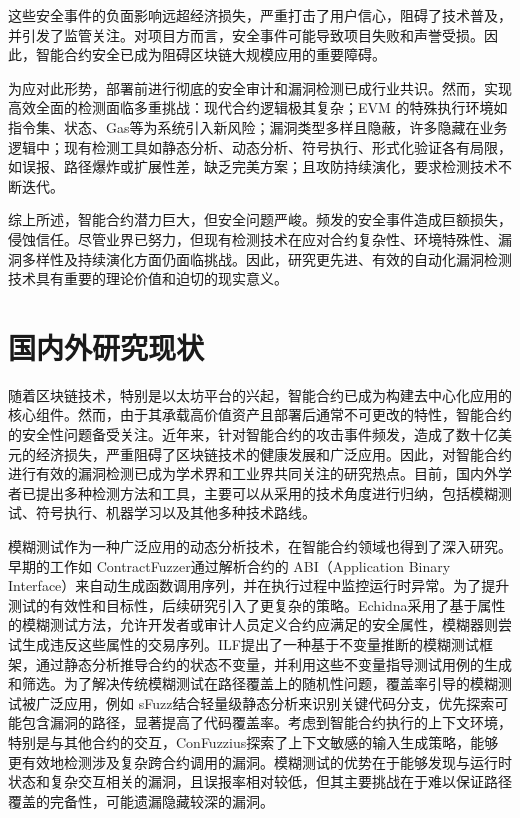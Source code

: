 \documentclass[print, master, vlined, timesmath]{DissertUESTC}
\begin{document}
这些安全事件的负面影响远超经济损失，严重打击了用户信心，阻碍了技术普及，并引发了监管关注\textsuperscript{\cite{SmartContract_2021}}。对项目方而言，安全事件可能导致项目失败和声誉受损。因此，智能合约安全已成为阻碍区块链大规模应用的重要障碍。

为应对此形势，部署前进行彻底的安全审计和漏洞检测已成行业共识\textsuperscript{\cite{FormalMethods_2022}}。然而，实现高效全面的检测面临多重挑战：现代合约逻辑极其复杂；EVM 的特殊执行环境如指令集、状态、Gas等为系统引入新风险；漏洞类型多样且隐蔽\textsuperscript{\cite{Blockchainsmart_2020}}，许多隐藏在业务逻辑中；现有检测工具如静态分析、动态分析、符号执行、形式化验证各有局限，如误报、路径爆炸或扩展性差，缺乏完美方案\textsuperscript{\cite{Howeffective_2020}}；且攻防持续演化，要求检测技术不断迭代。

综上所述，智能合约潜力巨大，但安全问题严峻。频发的安全事件造成巨额损失，侵蚀信任。尽管业界已努力，但现有检测技术在应对合约复杂性、环境特殊性、漏洞多样性及持续演化方面仍面临挑战。因此，研究更先进、有效的自动化漏洞检测技术具有重要的理论价值和迫切的现实意义。


\section{国内外研究现状}

随着区块链技术，特别是以太坊平台的兴起，智能合约已成为构建去中心化应用的核心组件。然而，由于其承载高价值资产且部署后通常不可更改的特性，智能合约的安全性问题备受关注。近年来，针对智能合约的攻击事件频发，造成了数十亿美元的经济损失，严重阻碍了区块链技术的健康发展和广泛应用\textsuperscript{\cite{jiao2024survey}}。因此，对智能合约进行有效的漏洞检测已成为学术界和工业界共同关注的研究热点。目前，国内外学者已提出多种检测方法和工具，主要可以从采用的技术角度进行归纳，包括模糊测试、符号执行、机器学习以及其他多种技术路线。

模糊测试作为一种广泛应用的动态分析技术，在智能合约领域也得到了深入研究。早期的工作如 ContractFuzzer\textsuperscript{\cite{jiang2018contractfuzzer}}通过解析合约的 ABI（Application Binary Interface）来自动生成函数调用序列，并在执行过程中监控运行时异常。为了提升测试的有效性和目标性，后续研究引入了更复杂的策略。Echidna\textsuperscript{\cite{grieco2020echidna}}采用了基于属性的模糊测试方法，允许开发者或审计人员定义合约应满足的安全属性，模糊器则尝试生成违反这些属性的交易序列。ILF\textsuperscript{\cite{he2019learning}}提出了一种基于不变量推断的模糊测试框架，通过静态分析推导合约的状态不变量，并利用这些不变量指导测试用例的生成和筛选。为了解决传统模糊测试在路径覆盖上的随机性问题，覆盖率引导的模糊测试被广泛应用，例如 sFuzz\textsuperscript{\cite{nguyen2020sfuzz}}结合轻量级静态分析来识别关键代码分支，优先探索可能包含漏洞的路径，显著提高了代码覆盖率。考虑到智能合约执行的上下文环境，特别是与其他合约的交互，ConFuzzius\textsuperscript{\cite{jiang2018contractfuzzer}}探索了上下文敏感的输入生成策略，能够更有效地检测涉及复杂跨合约调用的漏洞。模糊测试的优势在于能够发现与运行时状态和复杂交互相关的漏洞，且误报率相对较低，但其主要挑战在于难以保证路径覆盖的完备性，可能遗漏隐藏较深的漏洞。
\end{document}
